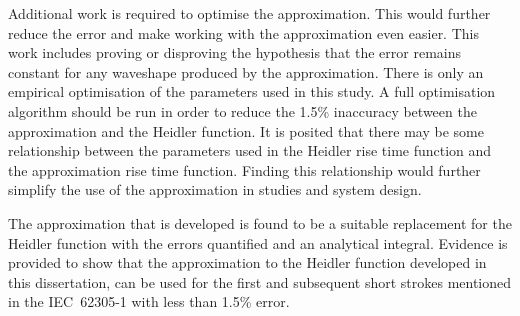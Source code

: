 Additional work is required to optimise the approximation. This would further reduce the error and make working with the approximation even easier. This work includes proving or disproving the hypothesis that the error remains constant for any waveshape produced by the approximation. There is only an empirical optimisation of the parameters used in this study. A full optimisation algorithm should be run in order to reduce the 1.5\% inaccuracy between the approximation and the Heidler function. It is posited that there may be some relationship between the parameters used in the Heidler rise time function and the approximation rise time function. Finding this relationship would further simplify the use of the approximation in studies and system design.

The approximation that is developed is found to be a suitable replacement for the Heidler function with the errors quantified and an analytical integral. Evidence is provided to show that the approximation to the Heidler function developed in this dissertation, can be used for the first and subsequent short strokes mentioned in the IEC~62305-1 with less than 1.5\% error.
